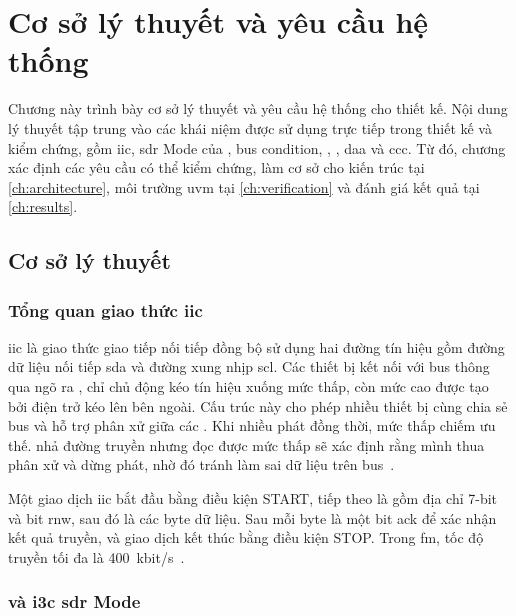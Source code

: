 \chapter{Cơ sở lý thuyết và yêu cầu hệ thống}
\label{ch:background-requirements}

Chương này trình bày cơ sở lý thuyết và yêu cầu hệ thống cho thiết kế. Nội dung lý thuyết tập trung vào các khái niệm được sử dụng trực tiếp trong thiết kế và kiểm chứng, gồm \gls{iic}, \gls{sdr} Mode của \MIPIIThreeCBasic{}, bus condition, \OpenDrain{}, \PushPull{}, \gls{daa} và \gls{ccc}. Từ đó, chương xác định các yêu cầu có thể kiểm chứng, làm cơ sở cho kiến trúc tại \cref{ch:architecture}, môi trường \gls{uvm} tại \cref{ch:verification} và đánh giá kết quả tại \cref{ch:results}.

\section{Cơ sở lý thuyết}
\label{sec:bg-theory}

\subsection{Tổng quan giao thức \texorpdfstring{\gls{iic}}{I2C}}
\label{sec:bg-i2c}

\gls{iic} là giao thức giao tiếp nối tiếp đồng bộ sử dụng hai đường tín hiệu gồm đường dữ liệu nối tiếp \acrfull{sda} và đường xung nhịp \acrfull{scl}. Các thiết bị kết nối với bus thông qua ngõ ra \OpenDrain{}, chỉ chủ động kéo tín hiệu xuống mức thấp, còn mức cao được tạo bởi điện trở kéo lên bên ngoài. Cấu trúc này cho phép nhiều thiết bị cùng chia sẻ bus và hỗ trợ phân xử giữa các \Controller{}. Khi nhiều \Controller{} phát đồng thời, mức thấp chiếm ưu thế. \Controller{} nhả đường truyền nhưng đọc được mức thấp sẽ xác định rằng mình thua phân xử và dừng phát, nhờ đó tránh làm sai dữ liệu trên bus~\cite{nxp_i2c}.

Một giao dịch \gls{iic} bắt đầu bằng điều kiện START, tiếp theo là \AddressHeader{} gồm địa chỉ 7-bit và bit \gls{rnw}, sau đó là các byte dữ liệu. Sau mỗi byte là một bit \gls{ack} để xác nhận kết quả truyền, và giao dịch kết thúc bằng điều kiện STOP. Trong \gls{fm}, tốc độ truyền tối đa là 400~kbit/s~\cite{nxp_i2c}.

\subsection{\MIPIIThreeCBasic{} và \texorpdfstring{\gls{i3c} \gls{sdr}}{I3C SDR} Mode}
\label{sec:bg-sdr}

